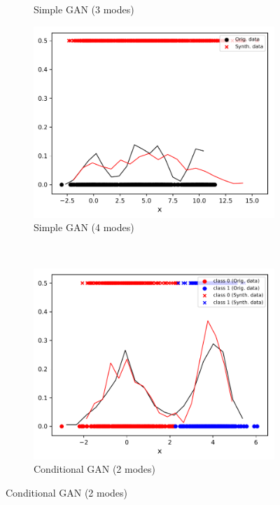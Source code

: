 \documentclass{article} %
\begin{document}
\begin{figure}[h]
\begin{subfigure}[b]{0.3\textwidth}
		\caption{Simple GAN (3 modes)}
		\label{fig:gan_3}
	\end{subfigure}
	\begin{subfigure}[b]{0.3\textwidth}
		\includegraphics[width=\textwidth]{4_gan_ls9_1000_1000.pdf}
		\caption{Simple GAN (4 modes)}
		\label{fig:gan_4}
	\end{subfigure} \\
	\begin{subfigure}[b]{0.3\textwidth}
		\includegraphics[width=\textwidth]{2_cond_gan_k2_ls9_1000_1000.pdf}
		\caption{Conditional GAN (2 modes)}
		\label{fig:cgan_2}
	\end{subfigure}

\end{figure}
\end{document}
